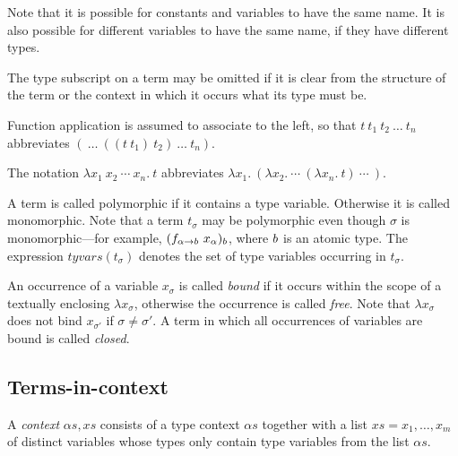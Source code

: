 Note that it is possible for constants and variables to have the
same name.  It is also possible for different variables to have the
same name, if they have different types.

The type subscript on a term may be omitted if it is clear from the
structure of the term or the context in which it occurs what its type
must be.

Function application is assumed to associate
to the left, so that $t\ t_1\ t_2\ \ldots\ t_n$ abbreviates $(\
\ldots\ ((t\ t_1)\ t_2)\ \ldots\ t_n)$.

The notation $\lambda x_1\ x_2\ \cdots\ x_n.\ t$ abbreviates $\lambda
x_1.\ (\lambda x_2.\ \cdots\ (\lambda x_n.\ t)\ \cdots\ )$.

A term is called polymorphic if it contains a type
variable. Otherwise it is called monomorphic. Note that a term
$t_{\sigma}$ may be polymorphic even though $\sigma$ is
monomorphic---for example, $(f_{\alpha{\to}{\sl b}}\ x_{\alpha})_{\sl
b}$, where $\sl b$ is an atomic type. The expression
$tyvars(t_{\sigma})$ denotes the set of type variables occurring in
$t_{\sigma}$.

An occurrence of a variable $x_{\sigma}$ is called {\it
bound\/}
 if it occurs within the scope of a textually enclosing
$\lambda x_{\sigma}$, otherwise the occurrence is called {\it
free\/}. Note that $\lambda x_{\sigma}$ does not bind
$x_{\sigma'}$ if $\sigma\neq \sigma'$.  A term in which all occurrences
of variables are bound is called {\it closed\/}.

\subsection{Terms-in-context}
\label{terms-in-context}

A {\em context\/} $\alpha\!s,\!x\!s$ consists of a type
context $\alpha\!s$ together with a list $x\!s=x_{1},\ldots,x_{m}$ of
distinct variables whose types only contain type variables from the
list $\alpha\!s$.

